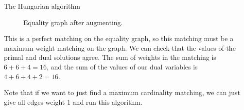 \documentclass[11pt]{article}
\renewcommand{\'}{^{'}}
\begin{document}
\begin{section}{The Hungarian algorithm}
\begin{figure}[H]
		\caption{Equality graph after augmenting.}
	\end{figure}
	This is a perfect matching on the equality graph, so this matching must be a maximum weight 
	matching on the graph. We can check that the values of the primal and dual solutions agree. 
	The sum of weights in the matching is $6+6+4 = 16$, and the sum of the values of our 
	dual variables is $4+6+4+2 = 16$.

	Note that if we want to just find a maximum cardinality matching, we can just give all edges 
	weight 1 and run this algorithm.
\end{section}
\end{document}
